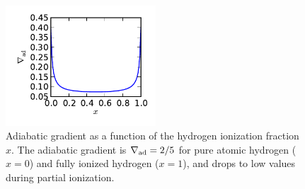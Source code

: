 \documentclass[apj]{emulateapj}
\newcommand{\delad}{\nabla_{\rm ad}}
\begin{document}
\begin{figure}[h]
\centering
\includegraphics[width=0.5\textwidth]{../../figs/ModelAtmospheres/RadSelfGravRealEOS/EOSeffects/delad_ionization.pdf}
\caption{Adiabatic gradient as a function of the hydrogen ionization fraction $x$. The adiabatic gradient is $\delad=2/5$ for pure atomic hydrogen ($x=0$) and fully ionized hydrogen ($x=1$), and drops to low values during partial ionization.}
\label{fig:deladion}
\end{figure}
\end{document}
